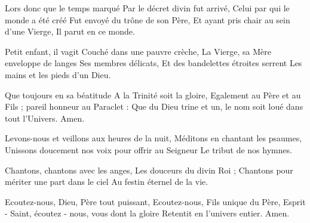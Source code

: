 \documentclass[psautier_nocturne_fr.tex]{subfiles}
\begin{document}
Lors donc que le temps marqué
Par le décret divin fut arrivé,
Celui par qui le monde a été créé
Fut envoyé du trône de son Père,
Et ayant pris chair au sein d'une Vierge,
Il parut en ce monde.

Petit enfant, il vagit
Couché dans une pauvre crèche,
La Vierge, sa Mère enveloppe de langes
Ses membres délicats,
Et des bandelettes étroites serrent
Les mains et les pieds d'un Dieu.

Que toujours en sa béatitude
A la Trinité soit la gloire,
Egalement au Père et au Fils ;
pareil honneur au Paraclet :
Que du Dieu trine et un, le nom
soit loué dans tout l’Univers.
Amen.

Levons-nous et veillons aux heures de la nuit,
Méditons en chantant les psaumes,
Unissons doucement nos voix pour offrir au Seigneur
Le tribut de nos hymnes.

Chantons, chantons avec les anges,
Les douceurs du divin Roi ;
Chantons pour mériter une part dans le ciel
Au festin éternel de la vie.

Ecoutez-nous, Dieu, Père tout puissant,
Ecoutez-nous, Fils unique du Père,
Esprit - Saint, écoutez - nous, vous dont la gloire
Retentit en l'univers entier.
Amen.


\begin{paracol}
\switchcolumn
{}
\end{paracol}

\begin{paracol}
\switchcolumn
\versiculus{}{}
\end{paracol}

\begin{paracol}
\switchcolumn
\versiculus{}{}
\end{paracol}
\end{document}
